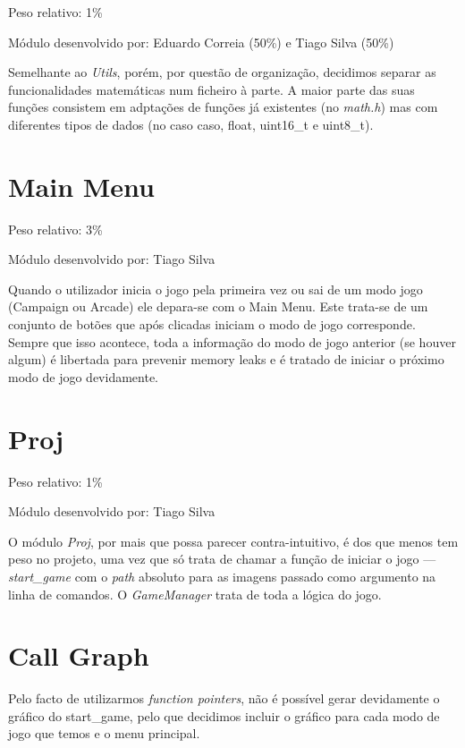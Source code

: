 \documentclass{report}
\begin{document}
Peso relativo: 1\%

Módulo desenvolvido por: Eduardo Correia (50\%) e Tiago Silva (50\%)
\newline

Semelhante ao \textit{Utils}, porém, por questão de organização, decidimos separar as funcionalidades matemáticas num ficheiro à parte. A maior parte das suas funções consistem em adptações de funções já existentes (no \textit{math.h}) mas com diferentes tipos de dados (no caso caso, float, uint16\_t e uint8\_t).

\section{Main Menu}

Peso relativo: 3\%

Módulo desenvolvido por: Tiago Silva
\newline

Quando o utilizador inicia o jogo pela primeira vez ou sai de um modo jogo (Campaign ou Arcade) ele depara-se com o Main Menu. Este trata-se de um conjunto de botões que após clicadas iniciam o modo de jogo corresponde. Sempre que isso acontece, toda a informação do modo de jogo anterior (se houver algum) é libertada para prevenir memory leaks e é tratado de iniciar o próximo modo de jogo devidamente.

\section{Proj}

Peso relativo: 1\%

Módulo desenvolvido por: Tiago Silva
\newline

O módulo \textit{Proj}, por mais que possa parecer contra-intuitivo, é dos que menos tem peso no projeto, uma vez que só trata de chamar a função de iniciar o jogo --- \textit{start\_game} com o \textit{path} absoluto para as imagens passado como argumento na linha de comandos. O \textit{GameManager} trata de toda a lógica do jogo.

\section{Call Graph}

Pelo facto de utilizarmos \textit{function pointers}, não é possível gerar devidamente o gráfico do start\_game, pelo que decidimos incluir o gráfico para cada modo de jogo que temos e o menu principal.
\end{document}
